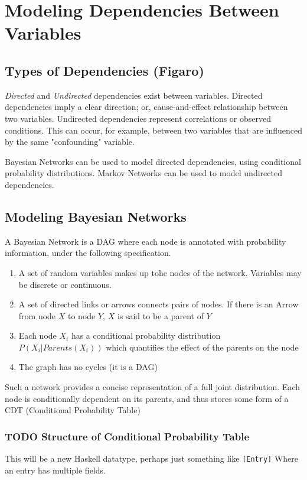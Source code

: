 \documentclass[11pt]{article}
\begin{document}
\section{Modeling Dependencies Between Variables}
\label{sec-2}
\subsection{Types of Dependencies (Figaro)}
\label{sec-2-1}

\emph{Directed} and \emph{Undirected} dependencies exist between
variables. Directed dependencies imply a clear direction; or,
cause-and-effect relationship between two variables. Undirected
dependencies represent correlations or observed conditions. This
can occur, for example, between two variables that are influenced
by the same "confounding" variable.

Bayesian Networks can be used to model directed dependencies,
using conditional probability distributions. Markov Networks can
be used to model undirected dependencies.

\subsection{Modeling Bayesian Networks}
\label{sec-2-2}

A Bayesian Network is a DAG where each node is annotated
with probability information, under the following specification.

\begin{enumerate}
\item A set of random variables makes up tohe nodes of the network. Variables
may be discrete or continuous.
\item A set of directed links or arrows connects pairs of nodes. If there is
an Arrow from node $X$ to node $Y$, $X$ is said to be a parent of $Y$
\item Each node $X_i$ has a conditional probability distribution
$P(X_i | Parents (X_i))$ which quantifies the effect of the
parents on the node
\item The graph has no cycles (it is a DAG)
\end{enumerate}

Such a network provides a concise representation of a full joint
distribution. Each node is conditionally dependent on its parents,
and thus stores some form of a CDT (Conditional Probability Table)

\subsubsection{{\bfseries\sffamily TODO} Structure of Conditional Probability Table}
\label{sec-2-2-1}
This will be a new Haskell datatype, perhaps just something like \texttt{[Entry]}
Where an entry has multiple fields.
\end{document}
